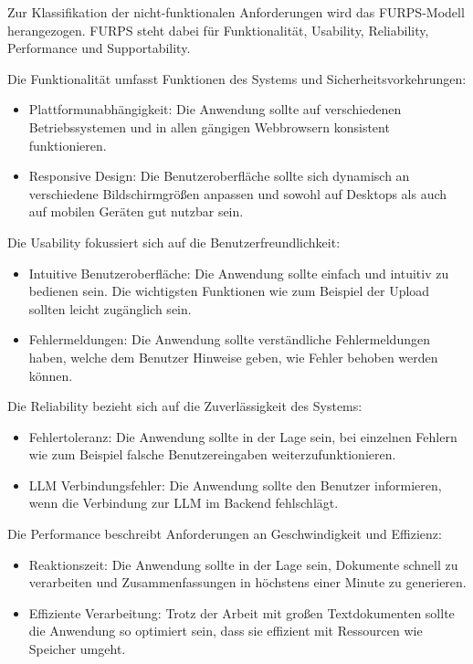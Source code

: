 Zur Klassifikation der nicht-funktionalen Anforderungen wird das FURPS-Modell herangezogen. FURPS steht dabei für Funktionalität, Usability, Reliability, Performance und Supportability. \cite{jamwal2010analysis}

Die Funktionalität umfasst Funktionen des Systems und Sicherheitsvorkehrungen:
\begin{itemize}
    \item Plattformunabhängigkeit: Die Anwendung sollte auf verschiedenen Betriebssystemen und in allen gängigen Webbrowsern konsistent funktionieren.
    \item Responsive Design: Die Benutzeroberfläche sollte sich dynamisch an verschiedene Bildschirmgrößen anpassen und sowohl auf Desktops als auch auf mobilen Geräten gut nutzbar sein.
\end{itemize}

Die Usability fokussiert sich auf die Benutzerfreundlichkeit:
\begin{itemize}
    \item Intuitive Benutzeroberfläche: Die Anwendung sollte einfach und intuitiv zu bedienen sein. Die wichtigsten Funktionen wie zum Beispiel der Upload sollten leicht zugänglich sein.
    \item Fehlermeldungen: Die Anwendung sollte verständliche Fehlermeldungen haben, welche dem Benutzer Hinweise geben, wie Fehler behoben werden können.
\end{itemize}

Die Reliability bezieht sich auf die Zuverlässigkeit des Systems:
\begin{itemize}
    \item Fehlertoleranz: Die Anwendung sollte in der Lage sein, bei einzelnen Fehlern wie zum Beispiel falsche Benutzereingaben weiterzufunktionieren.
    \item \ac{LLM} Verbindungsfehler: Die Anwendung sollte den Benutzer informieren, wenn die Verbindung zur \ac{LLM} im Backend fehlschlägt.
\end{itemize}

Die Performance beschreibt Anforderungen an Geschwindigkeit und Effizienz:
\begin{itemize}
    \item Reaktionszeit: Die Anwendung sollte in der Lage sein, Dokumente schnell zu verarbeiten und Zusammenfassungen in höchstens einer Minute zu generieren.
    \item Effiziente Verarbeitung: Trotz der Arbeit mit großen Textdokumenten sollte die Anwendung so optimiert sein, dass sie effizient mit Ressourcen wie Speicher umgeht.
\end{itemize}

